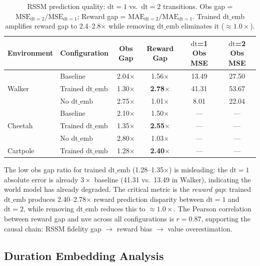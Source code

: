 \documentclass[10pt,letterpaper]{article}
\newcommand{\dt}{\mathrm{dt}}
\begin{document}
\begin{table}[h]
\centering
\caption{RSSM prediction quality: $\dt=1$ vs.\ $\dt=2$ transitions. Obs gap = $\text{MSE}_{\dt=2}/\text{MSE}_{\dt=1}$; Reward gap = $\text{MAE}_{\dt=2}/\text{MAE}_{\dt=1}$. Trained $\dt\_\text{emb}$ amplifies reward gap to 2.4--2.8$\times$ while removing $\dt\_\text{emb}$ eliminates it ($\approx 1.0\times$).}
\label{tab:rssm}
\begin{tabular}{llcccc}
\toprule
Environment & Configuration & Obs Gap & Reward Gap & $\dt$=1 Obs MSE & $\dt$=2 Obs MSE \\
\midrule
\multirow{3}{*}{Walker} & Baseline & 2.04$\times$ & 1.56$\times$ & 13.49 & 27.50 \\
                        & Trained $\dt\_\text{emb}$ & 1.30$\times$ & \textbf{2.78$\times$} & 41.31 & 53.67 \\
                        & No $\dt\_\text{emb}$ & 2.75$\times$ & 1.01$\times$ & 8.01 & 22.04 \\
\midrule
\multirow{3}{*}{Cheetah} & Baseline & 2.10$\times$ & 1.50$\times$ & --- & --- \\
                         & Trained $\dt\_\text{emb}$ & 1.35$\times$ & \textbf{2.55$\times$} & --- & --- \\
                         & No $\dt\_\text{emb}$ & 2.80$\times$ & 1.03$\times$ & --- & --- \\
\midrule
Cartpole & Trained $\dt\_\text{emb}$ & 1.28$\times$ & \textbf{2.40$\times$} & --- & --- \\
\bottomrule
\end{tabular}
\end{table}

The low obs gap ratio for trained $\dt\_\text{emb}$ (1.28--1.35$\times$) is misleading: the $\dt=1$ absolute error is already $3\times$ baseline (41.31 vs.\ 13.49 in Walker), indicating the world model has already degraded.
The critical metric is the \emph{reward gap}: trained $\dt\_\text{emb}$ produces 2.40--2.78$\times$ reward prediction disparity between $\dt=1$ and $\dt=2$, while removing $\dt\_\text{emb}$ reduces this to $\approx 1.0\times$.
The Pearson correlation between reward gap and nve across all configurations is $r = 0.87$, supporting the causal chain: RSSM fidelity gap $\rightarrow$ reward bias $\rightarrow$ value overestimation.

\subsection{Duration Embedding Analysis}
\label{sec:dt_emb_analysis}
\end{document}
